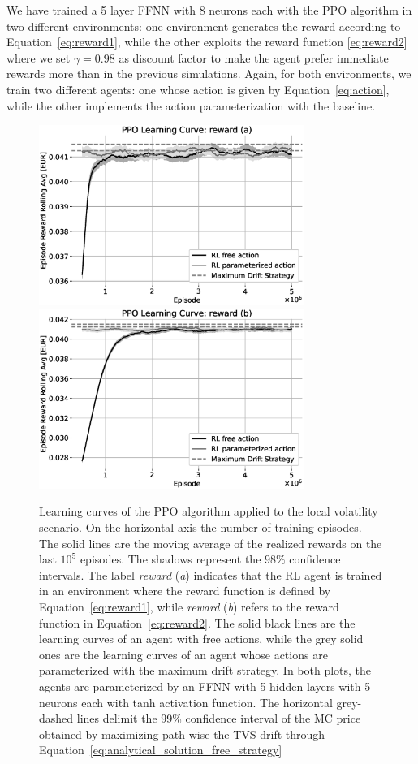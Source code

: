 \documentclass[runningheads]{m2ef}
\begin{document}
	We have trained a 5 layer FFNN with 8 neurons each with the PPO algorithm in two different environments: one environment generates the reward according to Equation~\eqref{eq:reward1}, while the other exploits the reward function \eqref{eq:reward2} where we set $\gamma=0.98$ as discount factor to make the agent prefer immediate rewards more than in the previous simulations. Again, for both environments, we train two different agents: one whose action is given by Equation~\eqref{eq:action}, while the other implements the action parameterization with the baseline.
	\begin{figure}[h!]
		\centering
		\includegraphics[width=3.4in]{LV_PPO_reward_a_learning_curve.eps}
		\includegraphics[width=3.4in]{LV_PPO_reward_b_learning_curve.eps}
		\caption{Learning curves of the PPO algorithm applied to the local volatility scenario. On the horizontal axis the number of training episodes. The solid lines are the moving average of the realized rewards on the last $10^5$ episodes. The shadows represent the $98\%$ confidence intervals. The label {\it reward} ({\it a}) indicates that the RL agent is trained in an environment where the reward function is defined by Equation~\eqref{eq:reward1}, while {\it reward} ({\it b}) refers to the reward function in Equation~\eqref{eq:reward2}. The solid black lines are the learning curves of an agent with free actions, while the grey solid ones are the learning curves of an agent whose actions are parameterized with the maximum drift strategy. In both plots, the agents are parameterized by an FFNN with 5 hidden layers with 5 neurons each with tanh activation function. The horizontal grey-dashed lines delimit the 99\% confidence interval of the MC price obtained by maximizing path-wise the TVS drift through Equation~\eqref{eq:analytical_solution_free_strategy}}\label{fig:PPO_results}
	\end{figure}
\end{document}

